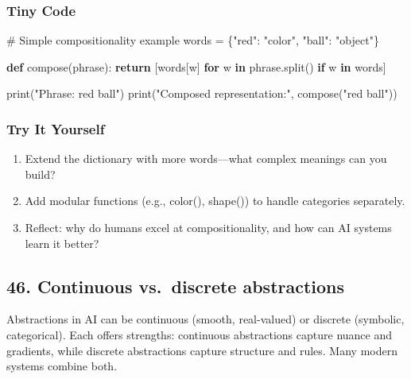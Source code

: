 \documentclass[
  letterpaper,
  DIV=11,
  numbers=noendperiod]{scrreprt}
\newenvironment{Shaded}{\begin{snugshade}}{\end{snugshade}}
\newcommand{\BuiltInTok}[1]{\textcolor[rgb]{0.00,0.23,0.31}{#1}}
\newcommand{\CommentTok}[1]{\textcolor[rgb]{0.37,0.37,0.37}{#1}}
\newcommand{\ControlFlowTok}[1]{\textcolor[rgb]{0.00,0.23,0.31}{\textbf{#1}}}
\newcommand{\KeywordTok}[1]{\textcolor[rgb]{0.00,0.23,0.31}{\textbf{#1}}}
\newcommand{\NormalTok}[1]{\textcolor[rgb]{0.00,0.23,0.31}{#1}}
\newcommand{\OperatorTok}[1]{\textcolor[rgb]{0.37,0.37,0.37}{#1}}
\newcommand{\StringTok}[1]{\textcolor[rgb]{0.13,0.47,0.30}{#1}}
\providecommand{\tightlist}{%
  \setlength{\itemsep}{0pt}\setlength{\parskip}{0pt}}
\begin{document}
\subsubsection{Tiny Code}\label{tiny-code-44}

\begin{Shaded}
\begin{Highlighting}[]
\CommentTok{\# Simple compositionality example}
\NormalTok{words }\OperatorTok{=}\NormalTok{ \{}\StringTok{"red"}\NormalTok{: }\StringTok{"color"}\NormalTok{, }\StringTok{"ball"}\NormalTok{: }\StringTok{"object"}\NormalTok{\}}

\KeywordTok{def}\NormalTok{ compose(phrase):}
    \ControlFlowTok{return}\NormalTok{ [words[w] }\ControlFlowTok{for}\NormalTok{ w }\KeywordTok{in}\NormalTok{ phrase.split() }\ControlFlowTok{if}\NormalTok{ w }\KeywordTok{in}\NormalTok{ words]}

\BuiltInTok{print}\NormalTok{(}\StringTok{"Phrase: \textquotesingle{}red ball\textquotesingle{}"}\NormalTok{)}
\BuiltInTok{print}\NormalTok{(}\StringTok{"Composed representation:"}\NormalTok{, compose(}\StringTok{"red ball"}\NormalTok{))}
\end{Highlighting}
\end{Shaded}

\subsubsection{Try It Yourself}\label{try-it-yourself-44}

\begin{enumerate}
\def\labelenumi{\arabic{enumi}.}
\tightlist
\item
  Extend the dictionary with more words---what complex meanings can you
  build?
\item
  Add modular functions (e.g., color(), shape()) to handle categories
  separately.
\item
  Reflect: why do humans excel at compositionality, and how can AI
  systems learn it better?
\end{enumerate}

\subsection{46. Continuous vs.~discrete
abstractions}\label{continuous-vs.-discrete-abstractions}

Abstractions in AI can be continuous (smooth, real-valued) or discrete
(symbolic, categorical). Each offers strengths: continuous abstractions
capture nuance and gradients, while discrete abstractions capture
structure and rules. Many modern systems combine both.
\end{document}
